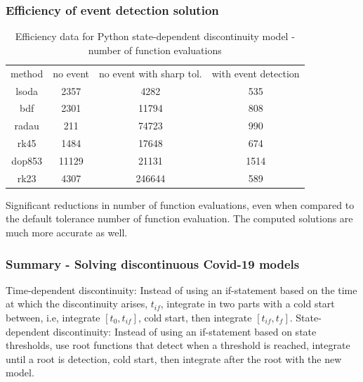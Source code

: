 \documentclass{beamer}
\begin{document}
\begin{frame}
\frametitle{Efficiency of event detection solution}
\begin{table}[h]
    \caption {Efficiency data for Python state-dependent discontinuity model - number of function evaluations} \label{tab:state_discontinuity_Py}
    \begin{center}
    \begin{tabular}{ c c c c } 
    method & no event & no event with sharp tol. & with event detection \\ 
    lsoda & 2357 & 4282 & 535 \\
    bdf & 2301 & 11794 & 808 \\
    radau & 211 & 74723 & 990 \\
    rk45 & 1484 & 17648 & 674 \\
    dop853 & 11129 & 21131 & 1514 \\
    rk23 & 4307 & 246644 & 589 \\
    \end{tabular}
    \end{center}
\end{table}
Significant reductions in number of function evaluations, even when compared to the default tolerance number of function evaluation. The computed solutions are much more accurate as well.
\end{frame}

\begin{frame}
\frametitle{Summary - Solving discontinuous Covid-19 models}
Time-dependent discontinuity:
Instead of using an if-statement based on the time at which the discontinuity arises, $t_{if}$, integrate in two parts with a cold start between, i.e, integrate $[t_0, t_{if}]$, cold start, then integrate $[t_{if}, t_f]$.
\newline \newline
State-dependent discontinuity:
Instead of using an if-statement based on state thresholds, use root functions that detect when a threshold is reached, integrate until a root is detection, cold start, then integrate after the root with the new model.
\newline \newline
\end{frame}
\end{document}
